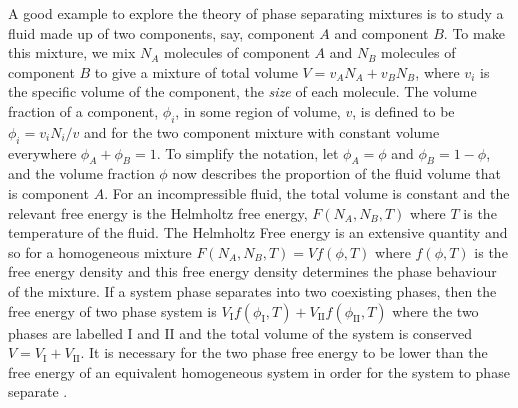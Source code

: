 A good example to explore the theory of phase separating mixtures is to study a fluid made up of two components, say, component $A$ and component $B$. To make this mixture, we mix $N_A$ molecules of component $A$ and $N_B$ molecules of component $B$ to give a mixture of total volume $V = v_A N_A + v_B N_B$, where $v_i$ is the specific volume of the component, the \textit{size} of each molecule. The volume fraction of a component, $\phi_i$, in some region of volume, $v$, is defined to be $\phi_i = v_i N_i/v$ and for the two component mixture with constant volume everywhere $\phi_A+\phi_B = 1$. To simplify the notation, let $\phi_A=\phi$ and $\phi_B=1-\phi$, and the volume fraction $\phi$ now describes the proportion of the fluid volume that is component $A$. For an incompressible fluid, the total volume is constant and the relevant free energy is the Helmholtz free energy, $F(N_A, N_B, T)$ where $T$ is the temperature of the fluid. The Helmholtz Free energy is an extensive quantity and so for a homogeneous mixture $F(N_A, N_B, T) = V f(\phi, T)$ where $f(\phi, T)$ is the free energy density and this free energy density determines the phase behaviour of the mixture. If a system phase separates into two coexisting phases, then the free energy of two phase system is $V_{\mathrm{I}} f(\phi_{\mathrm{I}}, T)+ V_{\mathrm{II}} f(\phi_{\mathrm{II}}, T)$ where the two phases are labelled $\mathrm{I}$ and $\mathrm{II}$ and the total volume of the system is conserved $V = V_{\mathrm{I}}+V_{\mathrm{II}}$. It is necessary for the two phase free energy to be lower than the free energy of an equivalent homogeneous system in order for the system to phase separate \cite{jones2002soft}.

